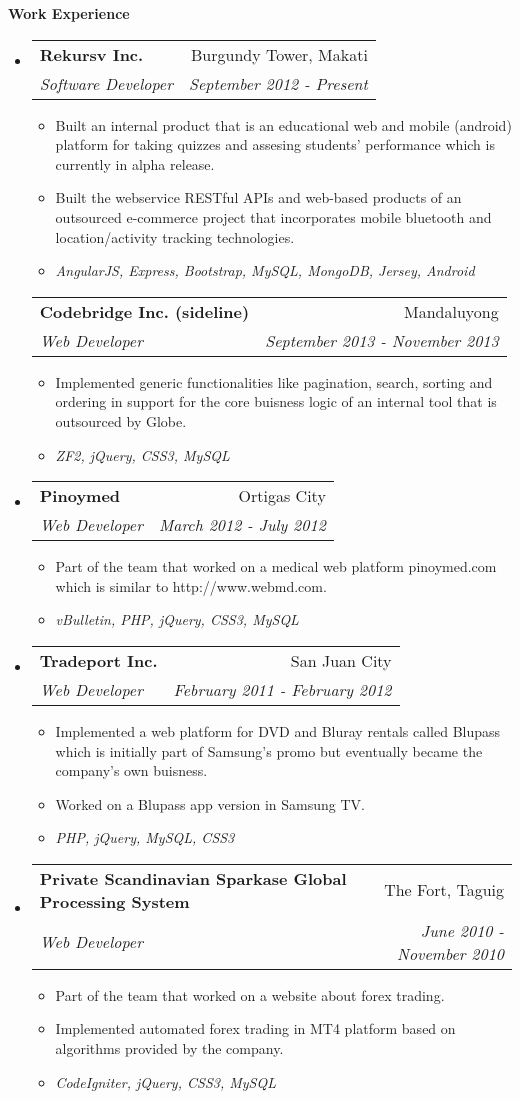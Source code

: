 \documentclass[letterpaper,11pt]{article}
\makeatletter
\newcommand{\resitem}[1]{\item #1 \vspace{-2pt}}
\newcommand{\resheading}[1]{{\large \colorbox{mygrey}{\begin{minipage}{\textwidth}{\textbf{#1 \vphantom{p\^{E}}}}\end{minipage}}}}
\newcommand{\ressubheading}[4]{
\begin{tabular*}{7.0in}{l@{\extracolsep{\fill}}r}
		\textbf{#1} & #2 \\
		\textit{#3} & \textit{#4} \\
\end{tabular*}\vspace{-6pt}}
\makeatother
\begin{document}
\resheading{Work Experience}
\begin{itemize}
\item
	\ressubheading{Rekursv Inc.}{Burgundy Tower, Makati}{Software Developer}{September 2012 - Present}
	\begin{itemize}
        \resitem{Built an internal product that is an educational web and mobile (android) platform for taking quizzes and assesing students' performance which is currently in alpha release.}
		\resitem{Built the webservice RESTful APIs and web-based products of an outsourced e-commerce project that incorporates mobile bluetooth and location/activity tracking technologies.}
        \resitem{\textit{AngularJS, Express, Bootstrap, MySQL, MongoDB, Jersey, Android}}
	\end{itemize}
    \ressubheading{Codebridge Inc. (sideline)}{Mandaluyong}{Web Developer}{September 2013 - November 2013}
	\begin{itemize}
		\resitem{Implemented generic functionalities like pagination, search, sorting and ordering in support for the core buisness logic of an internal tool that is outsourced by Globe.}
        \resitem{\textit{ZF2, jQuery, CSS3, MySQL}}
	\end{itemize}
\item
    \ressubheading{Pinoymed}{Ortigas City}{Web Developer}{March 2012 - July 2012}
	\begin{itemize}
		\resitem{Part of the team that worked on a medical web platform pinoymed.com which is similar to http://www.webmd.com.}
        \resitem{\textit{vBulletin, PHP, jQuery, CSS3, MySQL}}
	\end{itemize}
\item
	\ressubheading{Tradeport Inc.}{San Juan City}{Web Developer}{February 2011 - February 2012}
	\begin{itemize}
		\resitem{Implemented a web platform for DVD and Bluray rentals called Blupass which is initially part of Samsung's promo but eventually became the company's own buisness.}
		\resitem{Worked on a Blupass app version in Samsung TV.}
        \resitem{\textit{PHP, jQuery, MySQL, CSS3}}
	\end{itemize}
\item
	\ressubheading{Private Scandinavian Sparkase Global Processing System}{The Fort, Taguig}{Web Developer}{June 2010 - November 2010}
	\begin{itemize}
		\resitem{Part of the team that worked on a website about forex trading.}
		\resitem{Implemented automated forex trading in MT4 platform based on algorithms provided by the company.}
        \resitem{\textit{CodeIgniter, jQuery, CSS3, MySQL}}
	\end{itemize}
\end{itemize}
\end{document}
